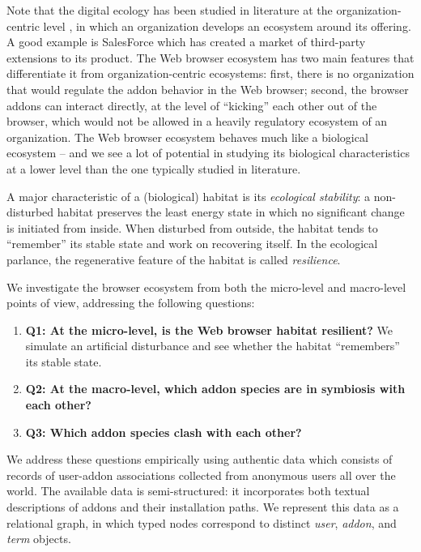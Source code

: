 \documentclass[ijoc,nonblindrev]{informs3} %
\numberwithin{equation}{subsection}
\begin{document}
Note that the digital ecology has been studied in literature at the organization-centric level \citep{christensen2014analysis}, in which an organization develops an ecosystem around its offering. A good example is SalesForce \citep{jansen2013defining} which has created a market of third-party extensions to its product. The Web browser ecosystem has two main features that differentiate it from organization-centric ecosystems: first, there is no organization that would regulate the addon behavior in the Web browser; second, the browser addons can interact directly, at the level of ``kicking'' each other out of the browser, which would not be allowed in a heavily regulatory ecosystem of an organization. The Web browser ecosystem behaves much like a biological ecosystem – and we see a lot of potential in studying its biological characteristics at a lower level than the one typically studied in literature.

A major characteristic of a (biological) habitat is its \emph{ecological stability}: a non-disturbed habitat preserves the least energy state in which no significant change is initiated from inside. When disturbed from outside, the habitat tends to ``remember'' its stable state and work on recovering itself. In the ecological parlance, the regenerative feature of the habitat is called \emph{resilience}. 

We investigate the browser ecosystem from both the micro-level and macro-level points of view, addressing the following questions:\\
\begin{enumerate}
\item \textbf{Q1: At the micro-level, is the Web browser habitat resilient?} We simulate an artificial disturbance and see whether the habitat ``remembers'' its stable state.
\item \textbf{Q2: At the macro-level, which addon species are in symbiosis with each other?}
\item \textbf{Q3: Which addon species clash with each other?}
\end{enumerate}

We address these questions empirically using authentic data which consists of records of user-addon associations collected from anonymous users all over the world. The available data is semi-structured: it incorporates both textual descriptions of addons and their installation paths. We represent this data as a relational graph, in which typed nodes correspond to distinct {\it user}, {\it addon}, and {\it term} objects. 
\end{document}
